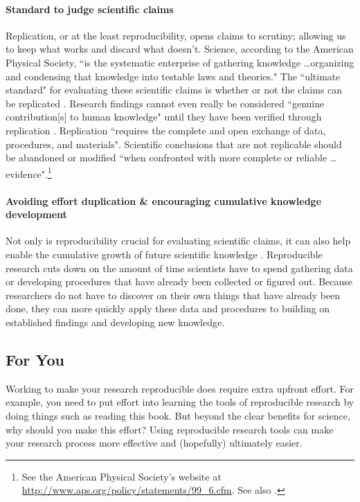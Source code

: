 \documentclass[krantz1]{krantz}
\begin{document}
\paragraph{Standard to judge scientific claims} 
Replication, or at the least reproducibility, opens claims to scrutiny; allowing us to keep what works and discard what doesn't. Science, according to the American Physical Society, ``is the systematic enterprise of gathering knowledge \ldots organizing and condensing that knowledge into testable laws and theories." The ``ultimate standard" for evaluating these scientific claims is whether or not the claims can be replicated \cite[]{Peng2011,Kelly2006}. Research findings cannot even really be considered ``genuine contribution[s] to human knowledge" until they have been verified through replication \cite[38]{Stodden2009}. Replication ``requires the complete and open exchange of data, procedures, and materials". Scientific conclusions that are not replicable should be abandoned or modified ``when confronted with more complete or reliable \ldots evidence".\footnote{See the American Physical Society's website at \url{http://www.aps.org/policy/statements/99_6.cfm}. See also \cite{Fomel2009}.} 

\paragraph{Avoiding effort duplication \& encouraging cumulative knowledge development} 
Not only is reproducibility crucial for evaluating scientific claims, it can also help enable the cumulative growth of future scientific knowledge \citep{Kelly2006,King1995}. Reproducible research cuts down on the amount of time scientists have to spend gathering data or developing procedures that have already been collected or figured out. Because researchers do not have to discover on their own things that have already been done, they can more quickly apply these data and procedures to building on established findings and developing new knowledge.

\subsection{For You}

Working to make your research reproducible does require extra upfront effort. For example, you need to put effort into learning the tools of reproducible research by doing things such as reading this book. But beyond the clear benefits for science, why should you make this effort? Using reproducible research tools can make your research process more effective and (hopefully) ultimately easier.
\end{document}
